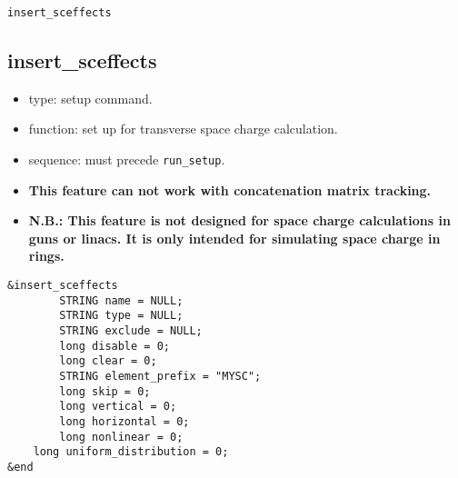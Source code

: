 \documentclass[11pt]{article}
\begin{document}
\newpage
\begin{center}{\Large\verb|insert_sceffects|}\end{center}
\subsection{insert\_sceffects \label{subsec:insertsceffects}}

\begin{itemize}
\item type: setup command.
\item function: set up for transverse space charge calculation.  
\item sequence: must precede \verb|run_setup|.
\item {\bf This feature can not work with concatenation matrix tracking.}
\item {\bf
N.B.: This feature is not designed for space charge calculations in
guns or linacs.  It is only intended for simulating space charge in
rings. }
\end{itemize}

\begin{verbatim}
&insert_sceffects
        STRING name = NULL;
        STRING type = NULL;
        STRING exclude = NULL;
        long disable = 0;
        long clear = 0;
        STRING element_prefix = "MYSC";
        long skip = 0;
        long vertical = 0;
        long horizontal = 0;
        long nonlinear = 0;
	long uniform_distribution = 0;
&end
\end{verbatim}
\end{document}

